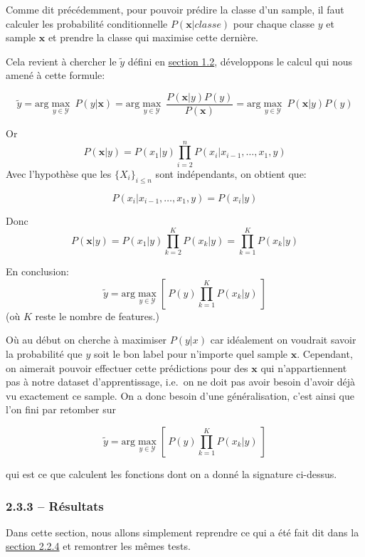 \documentclass[
]{article}
\begin{document}
Comme dit précédemment, pour pouvoir prédire la classe d'un sample, il
faut calculer les probabilité conditionnelle \(P(\mathbf{x}| classe)\)
pour chaque classe \(y\) et sample \(\mathbf{x}\) et prendre la classe
qui maximise cette dernière.

Cela revient à chercher le \(\tilde{y}\) défini en
\href{#naive-bayes}{section 1.2}, développons le calcul qui nous amené à
cette formule:

\[
\tilde{y}  = \text{arg}\max_{y \in \mathcal{Y}}\ P(y|\mathbf{x}) = \text{arg}\max_{y \in \mathcal{Y}}\ \frac{P(\mathbf{x}|y)  P(y)}{P(\mathbf{x})} =  \text{arg}\max_{y \in \mathcal{Y}}\ P(\mathbf{x}| y)P(y)
\]

Or \[ 
P(\mathbf{x}| y) = P(x_1 | y) \prod_{i = 2}^{n}{P(x_i | x_{i-1}, \ldots, x_1, y)}
\] Avec l'hypothèse que les \(\{X_i\}_{i \leq n}\) sont indépendants, on
obtient que:

\[P(x_i | x_{i-1}, \ldots, x_1, y) = P(x_i | y)\]

Donc
\[P(\mathbf{x}|y) = P(x_1 | y) \prod_{k = 2}^{K}{P(x_k | y)} = \prod_{k=1}^K{P(x_k | y)}\]

En conclusion:
\[ \tilde{y} = \text{arg}\max_{y \in \mathcal{Y}} \left[\  P(y) \prod_{k = 1}^K{P(x_k | y)}\  \right] \]
(où \(K\) reste le nombre de features.)

Où au début on cherche à maximiser \(P(y | x)\) car idéalement on
voudrait savoir la probabilité que \(y\) soit le bon label pour
n'importe quel sample \(\mathbf{x}\). Cependant, on aimerait pouvoir
effectuer cette prédictions pour des \(\mathbf{x}\) qui n'appartiennent
pas à notre dataset d'apprentissage, i.e.~on ne doit pas avoir besoin
d'avoir déjà vu exactement ce sample. On a donc besoin d'une
généralisation, c'est ainsi que l'on fini par retomber sur

\[ \tilde{y} = \text{arg}\max_{y \in \mathcal{Y}} \left[\  P(y) \prod_{k = 1}^K{P(x_k | y)}\  \right] \]

qui est ce que calculent les fonctions dont on a donné la signature
ci-dessus.

\hypertarget{ruxe9sultats-1}{%
\subsubsection{2.3.3 -- Résultats}\label{ruxe9sultats-1}}

Dans cette section, nous allons simplement reprendre ce qui a été fait
dit dans la \href{#ruxe9sultats}{section 2.2.4} et remontrer les mêmes
tests.
\end{document}
